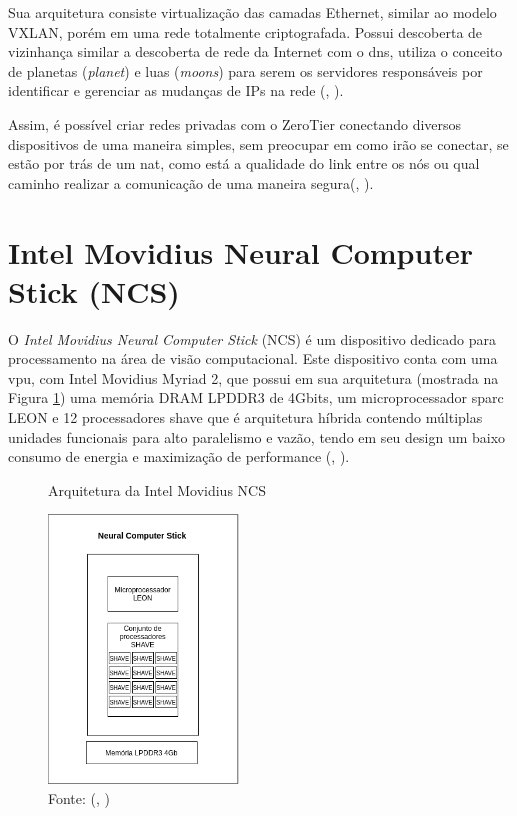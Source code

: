 \documentclass[]{politex}
\begin{document}
Sua arquitetura consiste virtualização das camadas Ethernet, similar ao modelo VXLAN, porém em uma rede totalmente criptografada. Possui descoberta de vizinhança similar a descoberta de rede da Internet com o \acrfull{dns}, utiliza o conceito de planetas (\textit{planet}) e luas (\textit{moons}) para serem os servidores responsáveis por identificar e gerenciar as mudanças de IPs na rede (, \citeyear{zerotier}).

Assim, é possível criar redes privadas com o ZeroTier conectando diversos dispositivos de uma maneira simples, sem preocupar em como irão se conectar, se estão por trás de um \acrfull{nat}, como está a qualidade do link entre os nós ou qual caminho realizar a comunicação de uma maneira segura(, \citeyear{zerotier}).

\section{Intel Movidius Neural Computer Stick (NCS)}
O \textit{Intel Movidius Neural Computer Stick} (NCS) é um dispositivo dedicado para processamento na área de visão computacional. Este dispositivo conta com uma \acrlong{vpu}, com Intel Movidius Myriad 2, que possui em sua arquitetura (mostrada na Figura \ref{fig:intel_movidius}) uma memória DRAM LPDDR3 de 4Gbits, um microprocessador \acrfull{sparc} LEON e 12 processadores \acrfull{shave} que é arquitetura híbrida contendo múltiplas unidades funcionais para alto paralelismo e vazão, tendo em seu design um baixo consumo de energia e maximização de performance (, \citeyear{intel_movidius}).

\begin{figure}[H]
    \centering
    \caption{Arquitetura da Intel Movidius NCS}
    \includegraphics[width=0.45\textwidth]{arquitetura_ncs}
    \caption*{Fonte: (, \citeyear{intel_movidius})}
    \label{fig:intel_movidius}
\end{figure}
\end{document}
